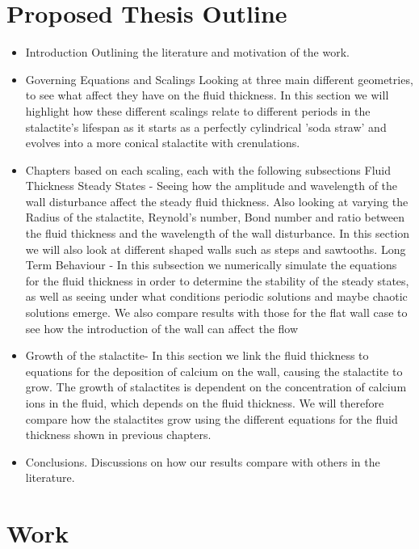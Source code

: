 \documentclass[12pt]{article}
\begin{document}
\section{Proposed Thesis Outline}
\begin{itemize}
	\item Introduction \subitem Outlining the literature and motivation of the work. \\
\item Governing Equations and Scalings \subitem Looking at three main different geometries, to see what affect they have on the fluid thickness. In this section we will highlight how these different scalings relate to different periods in the stalactite's lifespan as it starts as a perfectly cylindrical 'soda straw' and evolves into a more conical stalactite with crenulations.\\
\item Chapters based on each scaling, each with the following subsections
\subitem Fluid Thickness Steady States - Seeing how the amplitude and wavelength of the wall disturbance affect the steady fluid thickness. Also looking at varying the Radius of the stalactite, Reynold's number, Bond number and ratio between the fluid thickness and the wavelength of the wall disturbance. In this section we will also look at different shaped walls such as steps and sawtooths.
\subitem Long Term Behaviour - In this subsection we numerically simulate the equations for the fluid thickness in order to determine the stability of the steady states, as well as seeing under what conditions periodic solutions and maybe chaotic solutions emerge. We also compare results with those for the flat wall case to see how the introduction of the wall can affect the flow\\
\item Growth of the stalactite- In this section we link the fluid thickness to equations for the deposition of calcium on the wall, causing the stalactite to grow. The growth of stalactites is dependent on the concentration of calcium ions in the fluid, which depends on the fluid thickness. We will therefore compare how the stalactites grow using the different equations for the fluid thickness shown in previous chapters.  \\
\item Conclusions. Discussions on how our results compare with others in the literature.
\end{itemize}


\section{Work}
\end{document}
